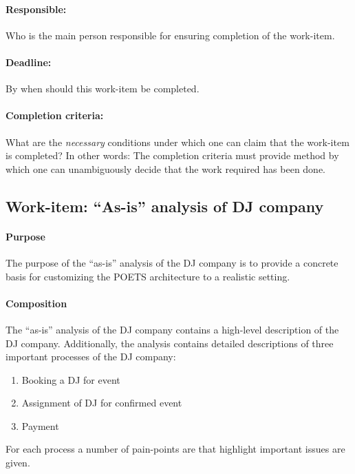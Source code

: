 \documentclass[envcountsame]{llncs}
\begin{document}
\paragraph{Responsible:} Who is the main person responsible for
ensuring completion of the work-item.

\paragraph{Deadline:} By when should this work-item be completed. 

\paragraph{Completion criteria:} What are the \emph{necessary}
conditions under which one can claim that the work-item is completed?
In other words: The completion criteria must provide method by which
one can unambiguously decide that the work required has been done.


\subsection*{Work-item: ``As-is'' analysis of DJ company}

\paragraph{Purpose} The purpose of the ``as-is'' analysis of the DJ
company is to provide a concrete basis for customizing the POETS
architecture to a realistic setting.

\paragraph{Composition} The ``as-is'' analysis of the DJ company
contains a high-level description of the DJ company. Additionally, the
analysis contains detailed descriptions of three important processes
of the DJ company:
\begin{enumerate}
\item Booking a DJ for event
\item Assignment of DJ for confirmed event
\item Payment
\end{enumerate}
For each process a number of pain-points are that highlight important
issues are given.
\end{document}
